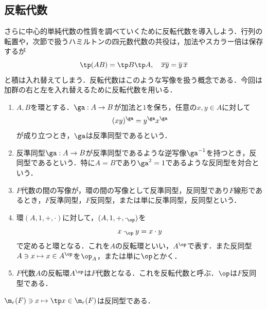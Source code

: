 \documentclass[a4paper,11pt]{jsarticle}
\begin{document}
\subsection{反転代数}
さらに中心的単純代数の性質を調べていくために反転代数を導入しよう．行列の転置や，次節で扱うハミルトンの四元数代数の共役は，加法やスカラー倍は保存するが
\[
  \tp(AB)=\tp B \tp A,\quad \overline{xy}=\overline{y}\,\overline{x}
\]
と積は入れ替えてしまう．反転代数はこのような写像を扱う概念である．今回は加群の右と左を入れ替えるために反転代数を用いる．
\begin{dfn}[反転代数]\label{dfn:reciprocal}
  \begin{enumerate}
    \item $A,B$を環とする．$\ga:A\to B$が加法と$1$を保ち，任意の$x,y\in A$に対して
          \[
            (xy)^\ga=y^\ga x^\ga
          \]
          が成り立つとき，$\ga$は反準同型であるという．
    \item 反準同型$\ga:A\to B$が反準同型であるような逆写像$\ga^{-1}$を持つとき，反同型であるという．特に$A=B$であり$\ga^2=1$であるような反同型を対合という．
    \item $F$代数の間の写像が，環の間の写像として反準同型，反同型であり$F$線形であるとき，$F$反準同型，$F$反同型，または単に反準同型，反同型という．
    \item 環$(A,1,+,\cdot)$に対して，$(A,1,+,\cdot_{\op})$を
          \[
            x\cdot_{\op} y = x\cdot y
          \]
          で定めると環となる．これを$A$の反転環といい，$A^{\op}$で表す．また反同型$A\ni x\mapsto x\in A^{\op}$を$\op_A$，または単に$\op$とかく．
    \item $F$代数$A$の反転環$A^{\op}$は$F$代数となる．これを反転代数と呼ぶ．$\op$は$F$反同型である．
  \end{enumerate}
\end{dfn}
\begin{eg}
  $\m_r(F)\ni x\mapsto \tp x\in\m_r(F)$は反同型である．
\end{eg}
\end{document}
